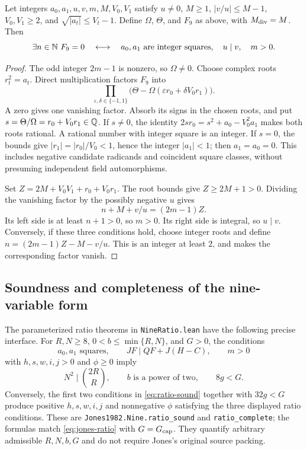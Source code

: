 \begin{lemma}
\label{lem:finalizer}
Let integers $a_0,a_1,u,v,m,M,V_0,V_1$ satisfy $u\ne0$, $M\ge1$,
$|v/u|\le M-1$, $V_0,V_1\ge2$, and
$\sqrt{|a_t|}\le V_t-1$. Define $\Omega$, $\Theta$, and $F_9$ as
above, with $M_{\rm div}=M$. Then
\[
 \exists n\in\mathbb N\ F_9=0
 \quad\longleftrightarrow\quad
 a_0,a_1\text{ are integer squares},\quad u\mid v,\quad m>0.
\]
\end{lemma}
\begin{proof}
The odd integer $2m-1$ is nonzero, so $\Omega\ne0$. Choose complex
roots $r_t^2=a_t$. Direct multiplication factors $F_9$ into
\[
 \prod_{\varepsilon,\delta\in\{-1,1\}}
       \bigl(\Theta-\Omega(\varepsilon r_0+\delta V_0r_1)\bigr).
\]
A zero gives one vanishing factor. Absorb its signs in the chosen
roots, and put $s=\Theta/\Omega=r_0+V_0r_1\in\mathbb Q$.
If $s\ne0$, the identity
$2sr_0=s^2+a_0-V_0^2a_1$ makes both roots rational. A rational
number with integer square is an integer. If $s=0$, the bounds give
$|r_1|=|r_0|/V_0<1$, hence the integer $|a_1|<1$; then
$a_1=a_0=0$. This includes negative candidate radicands and coincident
square classes, without presuming independent field automorphisms.

Set $Z=2M+V_0V_1+r_0+V_0r_1$. The root bounds give
$Z\ge2M+1>0$. Dividing the vanishing factor by the possibly negative
$u$ gives
\[
 n+M+v/u=(2m-1)Z.
\]
Its left side is at least $n+1>0$, so $m>0$. Its right side is
integral, so $u\mid v$. Conversely, if these three conditions hold,
choose integer roots and define
$n=(2m-1)Z-M-v/u$. This is an integer at least $2$, and makes
the corresponding factor vanish.
\end{proof}

\subsection{Soundness and completeness of the nine-variable form}

The parameterized ratio theorems in
\texttt{NineRatio.lean} have the following precise interface.
For $R,N\ge8$, $0<b\le\min\{R,N\}$, and $G>0$, the conditions
\[
 a_0,a_1\text{ squares},\qquad JF\mid QF+J(H-C),\qquad m>0
\]
with $h,s,w,i,j>0$ and $\phi\ge0$ imply
\begin{equation}
 N^2\mid\binom{2R}{R},\qquad b\text{ is a power of two},
 \qquad8g<G.
 \label{eq:ratio-sound}
\end{equation}
Conversely, the first two conditions in \eqref{eq:ratio-sound}
together with $32g<G$ produce positive $h,s,w,i,j$ and
nonnegative $\phi$ satisfying the three displayed ratio conditions.
These are \texttt{Jones1982.Nine.ratio\_sound} and
\texttt{ratio\_complete}; the formulas match \eqref{eq:jones-ratio}
with $G=G_{\rm cap}$. They quantify arbitrary admissible $R,N,b,G$
and do not require Jones's original source packing.

